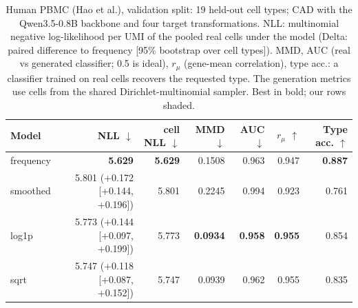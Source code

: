\begin{table}[!htb]
\centering
\small
\setlength{\tabcolsep}{4pt}
\begin{tabular}{lrrrrrr}
\toprule
Model & NLL $\downarrow$ & cell NLL $\downarrow$ & MMD $\downarrow$ & AUC $\downarrow$ & $r_\mu$ $\uparrow$ & Type acc. $\uparrow$ \\
\midrule
frequency & \textbf{5.629} & \textbf{5.629} & 0.1508 & 0.963 & 0.947 & \textbf{0.887} \\
smoothed & 5.801 (+0.172 [+0.144, +0.196]) & 5.801 & 0.2245 & 0.994 & 0.923 & 0.761 \\
log1p & 5.773 (+0.144 [+0.097, +0.199]) & 5.773 & \textbf{0.0934} & \textbf{0.958} & \textbf{0.955} & 0.854 \\
sqrt & 5.747 (+0.118 [+0.087, +0.152]) & 5.747 & 0.0939 & 0.962 & 0.955 & 0.835 \\
\bottomrule
\end{tabular}
\caption{Human PBMC (Hao et al.), validation split: 19 held-out cell types; CAD with the Qwen3.5-0.8B backbone and four target transformations. NLL: multinomial negative log-likelihood per UMI of the pooled real cells under the model (Delta: paired difference to frequency [95\% bootstrap over cell types]). MMD, AUC (real vs generated classifier; 0.5 is ideal), $r_\mu$ (gene-mean correlation), type acc.: a classifier trained on real cells recovers the requested type. The generation metrics use cells from the shared Dirichlet-multinomial sampler. Best in bold; our rows shaded.}
\label{tab:pbmc_val_transform}
\end{table}